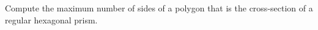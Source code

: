 Compute the maximum number of sides of a polygon that is the cross-section of a regular hexagonal prism.
